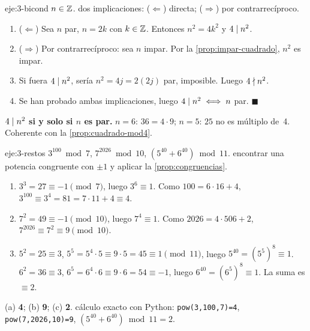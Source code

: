 \begin{solucion}{eje:3-bicond}
\datos $n\in\mathbb{Z}$.
\planteamiento dos implicaciones: ($\Leftarrow$) directa; ($\Rightarrow$) por contrarrecíproco.
\pasos
\begin{enumerate}[label=\arabic*.]
  \item ($\Leftarrow$) Sea $n$ par, $n=2k$ con $k\in\mathbb{Z}$. Entonces $n^{2}=4k^{2}$ y $4\mid n^{2}$.
  \item ($\Rightarrow$) Por contrarrecíproco: sea $n$ impar. Por la \cref{prop:impar-cuadrado}, $n^{2}$ es impar.
  \item Si fuera $4\mid n^{2}$, sería $n^{2}=4j=2(2j)$ par, imposible. Luego $4\nmid n^{2}$.
  \item Se han probado ambas implicaciones, luego $4\mid n^{2}\iff n$ par. $\blacksquare$
\end{enumerate}
\resultado \textbf{$4\mid n^{2}$ si y solo si $n$ es par.}
\comprobacion $n=6$: $36=4\cdot 9$; $n=5$: $25$ no es múltiplo de~4. Coherente con la \cref{prop:cuadrado-mod4}.
\end{solucion}

\begin{solucion}{eje:3-restos}
\datos $3^{100}\bmod 7$, $7^{2026}\bmod 10$, $(5^{40}+6^{40})\bmod 11$.
\planteamiento encontrar una potencia congruente con $\pm1$ y aplicar la \cref{prop:congruencias}.
\pasos
\begin{enumerate}[label=(\alph*)]
  \item $3^{3}=27\equiv -1\pmod 7$, luego $3^{6}\equiv 1$. Como $100=6\cdot 16+4$, $3^{100}\equiv 3^{4}=81=7\cdot 11+4\equiv 4$.
  \item $7^{2}=49\equiv -1\pmod{10}$, luego $7^{4}\equiv 1$. Como $2026=4\cdot 506+2$, $7^{2026}\equiv 7^{2}\equiv 9\pmod{10}$.
  \item $5^{2}=25\equiv 3$, $5^{5}=5^{4}\cdot 5\equiv 9\cdot 5=45\equiv 1\pmod{11}$, luego $5^{40}=(5^{5})^{8}\equiv 1$. $6^{2}=36\equiv 3$, $6^{5}=6^{4}\cdot 6\equiv 9\cdot 6=54\equiv -1$, luego $6^{40}=(6^{5})^{8}\equiv 1$. La suma es $\equiv 2$.
\end{enumerate}
\resultado (a) \textbf{4}; (b) \textbf{9}; (c) \textbf{2}.
\comprobacion cálculo exacto con Python: \texttt{pow(3,100,7)=4}, \texttt{pow(7,2026,10)=9}, $(5^{40}+6^{40})\bmod 11=2$.
\end{solucion}

